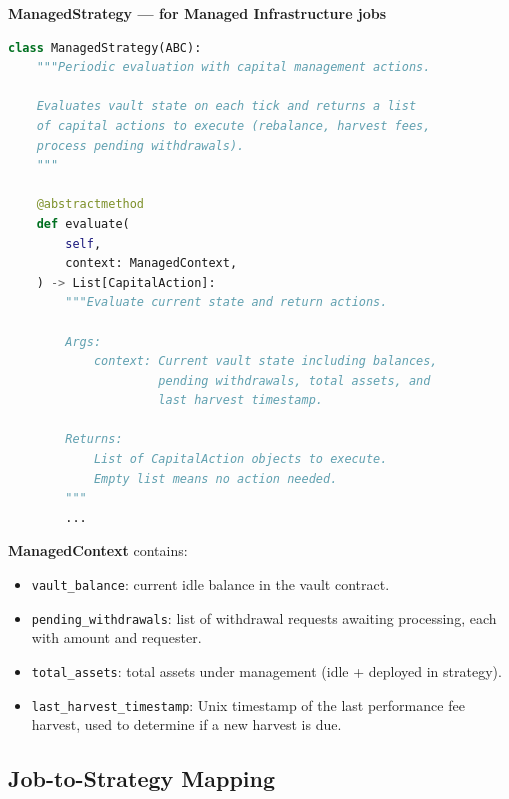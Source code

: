 \documentclass[11pt,a4paper]{article}
\begin{document}
\begin{contractbox}
\textbf{ManagedStrategy --- for Managed Infrastructure jobs}
\begin{lstlisting}[language=Python]
class ManagedStrategy(ABC):
    """Periodic evaluation with capital management actions.

    Evaluates vault state on each tick and returns a list
    of capital actions to execute (rebalance, harvest fees,
    process pending withdrawals).
    """

    @abstractmethod
    def evaluate(
        self,
        context: ManagedContext,
    ) -> List[CapitalAction]:
        """Evaluate current state and return actions.

        Args:
            context: Current vault state including balances,
                     pending withdrawals, total assets, and
                     last harvest timestamp.

        Returns:
            List of CapitalAction objects to execute.
            Empty list means no action needed.
        """
        ...
\end{lstlisting}
\end{contractbox}

\textbf{ManagedContext} contains:
\begin{itemize}[leftmargin=2em]
  \item \texttt{vault\_balance}: current idle balance in the vault contract.
  \item \texttt{pending\_withdrawals}: list of withdrawal requests awaiting processing, each with amount and requester.
  \item \texttt{total\_assets}: total assets under management (idle + deployed in strategy).
  \item \texttt{last\_harvest\_timestamp}: Unix timestamp of the last performance fee harvest, used to determine if a new harvest is due.
\end{itemize}

\subsection{Job-to-Strategy Mapping}
\end{document}
